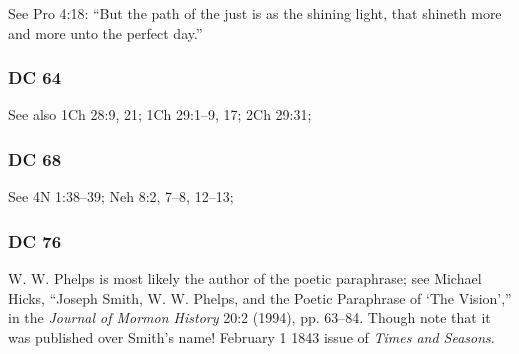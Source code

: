 		\begin{compactdesc}
		
		\item[24$\vert$]
		\begin{compactdesc}
		\item[brighter and brighter until the perfect day] See Pro 4:18: ``But the path of the just is as the shining light, that shineth more and more unto the perfect day.''
		\end{compactdesc}
		
		\end{compactdesc}

	\subsubsection{DC 64} %
	
		\begin{compactdesc}
		
		\item[34$\vert$]
		\begin{compactdesc}
		\item[requireth the heart and a willing mind] See also 1Ch 28:9, 21; 1Ch 29:1--9, 17; 2Ch 29:31; 
		\end{compactdesc}
		
		\end{compactdesc}
		
	\subsubsection{DC 68} %
	
		\begin{compactdesc}
		
		\item[25$\vert$]
		\begin{compactdesc}
		\item[teach them not to understand the doctrine...] See 4N 1:38--39; Neh 8:2, 7--8, 12--13;
		\end{compactdesc}
		
		\end{compactdesc}
		
	\subsubsection{DC 76} %
	
		W. W. Phelps is most likely the author of the poetic paraphrase; see Michael Hicks, ``Joseph Smith, W. W. Phelps, and the Poetic Paraphrase of `The Vision','' in the \textit{Journal of Mormon History} 20:2 (1994), pp. 63--84.
			Though note that it was published over Smith's name! February 1 1843 issue of \textit{Times and Seasons}.
			
